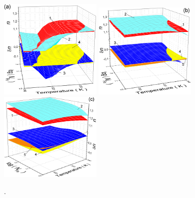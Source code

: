 ﻿\documentclass[12pt]{article}
\begin{document}
\begin{figure}
\includegraphics[width=4.9cm]{FigB105d15} \hfill
\includegraphics[width=4.9cm]{FigB106d15} \hfill
\includegraphics[width=4.9cm]{FigB107d15}
\caption{.
}
\label{FigTNfe}
\end{figure}
\end{document}
